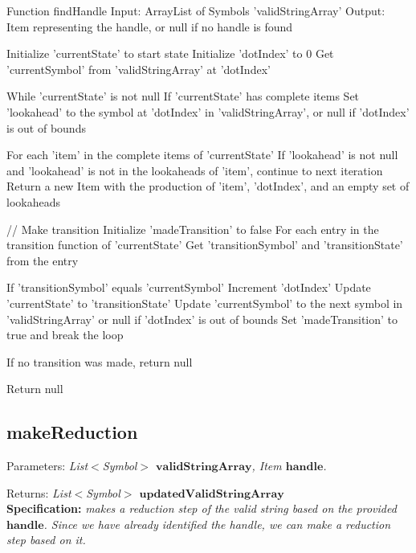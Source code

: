 \begin{codeblock}
    Function findHandle
    Input: ArrayList of Symbols 'validStringArray'
    Output: Item representing the handle, or null if no handle is found

    Initialize 'currentState' to start state
    Initialize 'dotIndex' to 0
    Get 'currentSymbol' from 'validStringArray' at 'dotIndex'

    While 'currentState' is not null
    If 'currentState' has complete items
    Set 'lookahead' to the symbol at 'dotIndex' in 'validStringArray', or null if 'dotIndex' is out of bounds

    For each 'item' in the complete items of 'currentState'
    If 'lookahead' is not null and 'lookahead' is not in the lookaheads of 'item', continue to next iteration
    Return a new Item with the production of 'item', 'dotIndex', and an empty set of lookaheads

    // Make transition
    Initialize 'madeTransition' to false
    For each entry in the transition function of 'currentState'
    Get 'transitionSymbol' and 'transitionState' from the entry

    If 'transitionSymbol' equals 'currentSymbol'
    Increment 'dotIndex'
    Update 'currentState' to 'transitionState'
    Update 'currentSymbol' to the next symbol in 'validStringArray' or null if 'dotIndex' is out of bounds
    Set 'madeTransition' to true and break the loop

    If no transition was made, return null

    Return null
\end{codeblock}

\vspace{20pt}

\subsection{makeReduction}

Parameters: \textit{List\(<\)Symbol\(>\) \(\boldsymbol{validStringArray}\), Item \(\boldsymbol{handle}\).}

Returns: \textit{List\(<\)Symbol\(>\) \(\boldsymbol{updatedValidStringArray}\)}\\

\textbf{Specification:} \textit{makes a reduction step of the valid string based on the provided \(\boldsymbol{handle}\).
Since we have already identified the handle, we can make a reduction step based on it.
}\\

